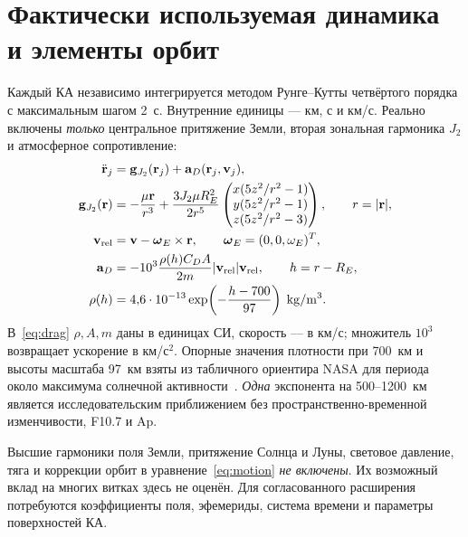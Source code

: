 \documentclass[a4paper,12pt]{article}
\begin{document}
\section{Фактически используемая динамика и элементы орбит}

Каждый КА независимо интегрируется методом Рунге--Кутты четвёртого
порядка с максимальным шагом 2~с. Внутренние единицы --- км, с и
км/с. Реально включены \emph{только} центральное притяжение Земли,
вторая зональная гармоника $J_2$ и атмосферное сопротивление:
\begin{align}
 \ddot{\mathbf r}_j&=\mathbf g_{J_2}(\mathbf r_j)
                     +\mathbf a_D(\mathbf r_j,\mathbf v_j),
                     \label{eq:motion}\\
 \mathbf g_{J_2}(\mathbf r)&=-\frac{\mu\mathbf r}{r^3}
 +\frac{3J_2\mu R_E^2}{2r^5}
 \begin{pmatrix}
 x(5z^2/r^2-1)\\y(5z^2/r^2-1)\\z(5z^2/r^2-3)
 \end{pmatrix},\qquad r=|\mathbf r|,\label{eq:j2}\\
 \mathbf v_{\rm rel}&=\mathbf v-\boldsymbol\omega_E\times\mathbf r,
 \qquad \boldsymbol\omega_E=(0,0,\omega_E)^T,\nonumber\\
 \mathbf a_D&=-10^3\frac{\rho(h)C_DA}{2m}
 |\mathbf v_{\rm rel}|\mathbf v_{\rm rel},\qquad
 h=r-R_E,\label{eq:drag}\\
 \rho(h)&=4{,}6\cdot10^{-13}
 \exp\!\left(-\frac{h-700}{97}\right)\;\mathrm{kg/m^3}.
 \label{eq:density}
\end{align}
В~\eqref{eq:drag} $\rho,A,m$ даны в единицах СИ, скорость --- в
км/с; множитель $10^3$ возвращает ускорение в км/с$^2$.
Опорные значения плотности при 700~км и высоты масштаба 97~км
взяты из табличного ориентира NASA для периода около максимума
солнечной активности~\cite{atmosphere}. \emph{Одна} экспонента
на 500--1200~км является исследовательским приближением без
пространственно-временной изменчивости, F10.7 и Ap.

Высшие гармоники поля Земли, притяжение Солнца и Луны, световое
давление, тяга и коррекции орбит в уравнение~\eqref{eq:motion}
\emph{не включены}. Их возможный вклад на многих витках здесь
не оценён. Для согласованного расширения потребуются коэффициенты
поля, эфемериды, система времени и параметры поверхностей КА.
\end{document}
